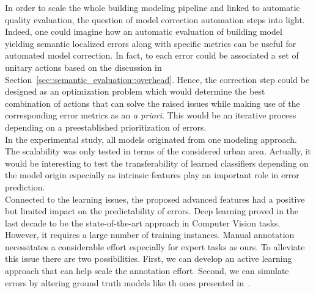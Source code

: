     In order to scale the whole building modeling pipeline and linked to automatic quality evaluation, the question of model correction automation steps into light.
    Indeed, one could imagine how an automatic evaluation of building model yielding semantic localized errors along with specific metrics can be useful for automated model correction.
    In fact, to each error could be associated a set of unitary actions based on the discussion in Section~\ref{sec::semantic_evaluation::overhead}.
    Hence, the correction step could be designed as an optimization problem which would determine the best combination of actions that can solve the raised issues while making use of the corresponding error metrics as an \textit{a priori}.
    This would be an iterative process depending on a preestablished prioritization of errors.\\
    
    In the experimental study, all models originated from one modeling approach.
    The scalability was only tested in terms of the considered urban area.
    Actually, it would be interesting to test the transferability of learned classifiers depending on the model origin especially as intrinsic features play an important role in error prediction.\\

    Connected to the learning issues, the proposed advanced features had a positive but limited impact on the predictability of errors.
    Deep learning proved in the last decade to be the state-of-the-art approach in Computer Vision tasks.
    However, it requires a large number of training instances.
    Manual annotation necessitates a considerable effort especially for expert tasks as ours.
    To alleviate this issue there are two possibilities.
    First, we can develop an active learning approach that can help scale the annotation effort.
    Second, we can simulate errors by altering ground truth models like th ones presented in~\parencite{rottensteiner2012isprs}.
